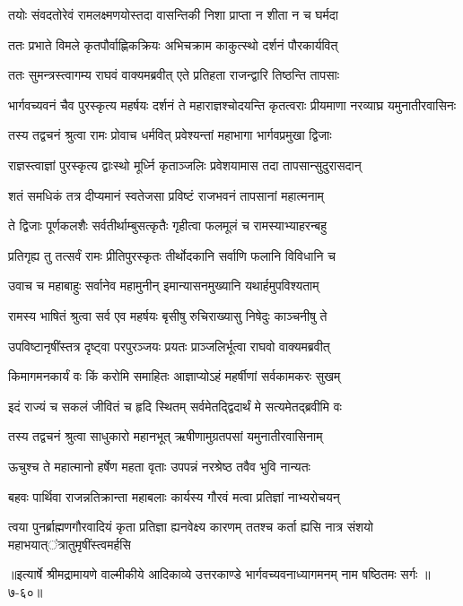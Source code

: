 
\twolineshloka
{तयोः संवदतोरेवं रामलक्ष्मणयोस्तदा}
{वासन्तिकी निशा प्राप्ता न शीता न च घर्मदा} %

\twolineshloka
{ततः प्रभाते विमले कृतपौर्वाह्णिकक्रियः}
{अभिचक्राम काकुत्स्थो दर्शनं पौरकार्यवित्} %

\twolineshloka
{ततः सुमन्त्रस्त्वागम्य राघवं वाक्यमब्रवीत्}
{एते प्रतिहता राजन्द्वारि तिष्ठन्ति तापसाः} %

\threelineshloka
{भार्गवच्यवनं चैव पुरस्कृत्य महर्षयः}
{दर्शनं ते महाराज्ञश्चोदयन्ति कृतत्वराः}
{प्रीयमाणा नरव्याघ्र यमुनातीरवासिनः} %

\twolineshloka
{तस्य तद्वचनं श्रुत्वा रामः प्रोवाच धर्मवित्}
{प्रवेश्यन्तां महाभागा भार्गवप्रमुखा द्विजाः} %

\twolineshloka
{राज्ञस्त्वाज्ञां पुरस्कृत्य द्वाःस्थो मूर्ध्नि कृताञ्जलिः}
{प्रवेशयामास तदा तापसान्सुदुरासदान्} %

\twolineshloka
{शतं समधिकं तत्र दीप्यमानं स्वतेजसा}
{प्रविष्टं राजभवनं तापसानां महात्मनाम्} %

\twolineshloka
{ते द्विजाः पूर्णकलशैः सर्वतीर्थाम्बुसत्कृतैः}
{गृहीत्वा फलमूलं च रामस्याभ्याहरन्बहु} %

\twolineshloka
{प्रतिगृह्य तु तत्सर्वं रामः प्रीतिपुरस्कृतः}
{तीर्थोदकानि सर्वाणि फलानि विविधानि च} %

\twolineshloka
{उवाच च महाबाहुः सर्वानेव महामुनीन्}
{इमान्यासनमुख्यानि यथार्हमुपविश्यताम्} %

\twolineshloka
{रामस्य भाषितं श्रुत्वा सर्व एव महर्षयः}
{बृसीषु रुचिराख्यासु निषेदुः काञ्चनीषु ते} %

\twolineshloka
{उपविष्टानृषींस्तत्र दृष्ट्वा परपुरञ्जयः}
{प्रयतः प्राञ्जलिर्भूत्वा राघवो वाक्यमब्रवीत्} %

\twolineshloka
{किमागमनकार्यं वः किं करोमि समाहितः}
{आज्ञाप्योऽहं महर्षीणां सर्वकामकरः सुखम्} %

\twolineshloka
{इदं राज्यं च सकलं जीवितं च हृदि स्थितम्}
{सर्वमेतद्द्विदार्थं मे सत्यमेतद्ब्रवीमि वः} %

\twolineshloka
{तस्य तद्वचनं श्रुत्वा साधुकारो महानभूत्}
{ऋषीणामुग्रतपसां यमुनातीरवासिनाम्} %

\twolineshloka
{ऊचुश्च ते महात्मानो हर्षेण महता वृताः}
{उपपन्नं नरश्रेष्ठ तवैव भुवि नान्यतः} %

\twolineshloka
{बहवः पार्थिवा राजन्नतिक्रान्ता महाबलाः}
{कार्यस्य गौरवं मत्वा प्रतिज्ञां नाभ्यरोचयन्} %

\twolineshloka
{त्वया पुनर्ब्राह्मणगौरवादियं कृता प्रतिज्ञा ह्यनवेक्ष्य कारणम्}
{ततश्च कर्ता ह्यसि नात्र संशयो महाभयात्ऺत्रातुमृषींस्त्वमर्हसि} %


॥इत्यार्षे श्रीमद्रामायणे वाल्मीकीये आदिकाव्ये उत्तरकाण्डे भार्गवच्यवनाध्यागमनम् नाम षष्ठितमः सर्गः ॥७-६०॥
